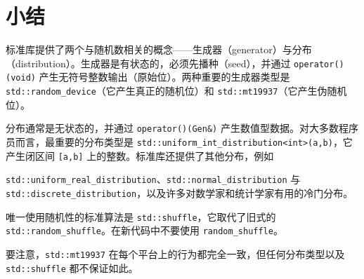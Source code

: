 \section{小结}

标准库提供了两个与随机数相关的概念——生成器（generator）与分布（distribution）。生成器是有状态的，必须先播种（seed），并通过 \texttt{operator(\allowbreak{})\allowbreak{}(\allowbreak{}void)\allowbreak{}} 产生无符号整数输出（原始位）。两种重要的生成器类型是 \texttt{std::\allowbreak{}random\_\allowbreak{}device}（它产生真正的随机位）和 \texttt{std::\allowbreak{}mt19937}（它产生伪随机位）。

分布通常是无状态的，并通过 \texttt{operator(\allowbreak{})\allowbreak{}(\allowbreak{}Gen\&)\allowbreak{}} 产生数值型数据。对大多数程序员而言，最重要的分布类型是 \texttt{std::\allowbreak{}uniform\_\allowbreak{}int\_\allowbreak{}distribution<\allowbreak{}int>\allowbreak{}(\allowbreak{}a,\allowbreak{}b)\allowbreak{}}，它产生闭区间 \texttt{[a,\allowbreak{}b]} 上的整数。标准库还提供了其他分布，例如

\texttt{std::\allowbreak{}uniform\_\allowbreak{}real\_\allowbreak{}distribution}、\texttt{std::\allowbreak{}normal\_\allowbreak{}distribution} 与 \texttt{std::\allowbreak{}discrete\_\allowbreak{}distribution}，以及许多对数学家和统计学家有用的冷门分布。

唯一使用随机性的标准算法是 \texttt{std::\allowbreak{}shuffle}，它取代了旧式的 \texttt{std::\allowbreak{}random\_\allowbreak{}shuffle}。在新代码中不要使用 \texttt{random\_\allowbreak{}shuffle}。

要注意，\texttt{std::\allowbreak{}mt19937} 在每个平台上的行为都完全一致，但任何分布类型以及 \texttt{std::\allowbreak{}shuffle} 都不保证如此。
